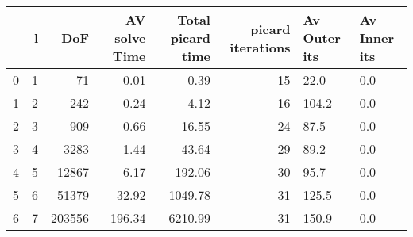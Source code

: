 \begin{tabular}{lrrrrrll}
\toprule
{} &  l &     DoF &  AV solve Time &  Total picard time &  picard iterations & Av Outer its & Av Inner its \\
\midrule
0 &  1 &      71 &           0.01 &               0.39 &                 15 &         22.0 &          0.0 \\
1 &  2 &     242 &           0.24 &               4.12 &                 16 &        104.2 &          0.0 \\
2 &  3 &     909 &           0.66 &              16.55 &                 24 &         87.5 &          0.0 \\
3 &  4 &    3283 &           1.44 &              43.64 &                 29 &         89.2 &          0.0 \\
4 &  5 &   12867 &           6.17 &             192.06 &                 30 &         95.7 &          0.0 \\
5 &  6 &   51379 &          32.92 &            1049.78 &                 31 &        125.5 &          0.0 \\
6 &  7 &  203556 &         196.34 &            6210.99 &                 31 &        150.9 &          0.0 \\
\bottomrule
\end{tabular}

